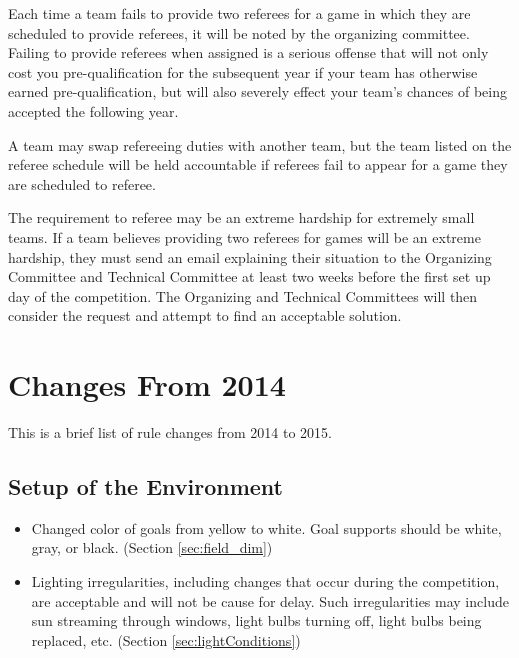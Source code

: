 \documentclass[12pt]{article}
\begin{document}
Each time a team fails to provide two referees for a game in which they are scheduled to provide referees, it will be noted by the organizing committee.  Failing to provide referees when assigned is a serious offense that will not only cost you pre-qualification for the subsequent year if your team has otherwise earned pre-qualification, but will also severely effect your team's chances of being accepted the following year.

A team may swap refereeing duties with another team, but the team listed on the referee schedule will be held accountable if referees fail to appear for a game they are scheduled to referee.

The requirement to referee may be an extreme hardship for extremely small teams.  If a team believes providing two referees for games will be an extreme hardship, they must send an email explaining their situation to the Organizing Committee and Technical Committee at least two weeks before the first set up day of the competition.  The Organizing and Technical Committees will then consider the request and attempt to find an acceptable solution.


\newpage


\section{Changes From 2014}
This is a brief list of rule changes from 2014 to 2015.

\subsection*{Setup of the Environment}
\begin{itemize}
	\item Changed color of goals from yellow to white. Goal supports should be white, gray, or black. (Section \ref{sec:field_dim})
	\item Lighting irregularities, including changes that occur during the competition, are acceptable and will not be cause for delay.  Such irregularities may include sun streaming through windows, light bulbs turning off, light bulbs being replaced, etc. (Section \ref{sec:lightConditions})
\end{itemize}
\end{document}
